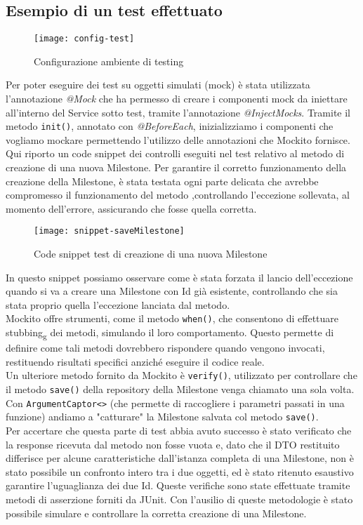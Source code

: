 \subsection{Esempio di un test effettuato}
\begin{figure}[H] 
    \centering 
    \texttt{[image: config-test]} 
    \caption{Configurazione ambiente di testing}
\end{figure}
Per poter eseguire dei test su oggetti simulati (mock) è stata utilizzata l'annotazione \textit{@Mock} che ha permesso di creare i componenti mock da iniettare all’interno del Service sotto test, tramite l’annotazione \textit{@InjectMocks}. Tramite il metodo \texttt{init()}, annotato con \textit{@BeforeEach}, inizializziamo i componenti che vogliamo mockare permettendo l’utilizzo delle annotazioni che Mockito fornisce.\\
Qui riporto un code snippet dei controlli eseguiti nel test relativo al metodo di creazione di una nuova Milestone. Per garantire il corretto funzionamento della creazione della Milestone, è stata testata ogni parte delicata che avrebbe compromesso il funzionamento del metodo ,controllando l’eccezione sollevata, al momento dell’errore, assicurando che fosse quella corretta.\\

\begin{figure}[H] 
    \centering 
    \texttt{[image: snippet-saveMilestone]} 
    \caption{Code snippet test di creazione di una nuova Milestone}
\end{figure}

\noindent In questo snippet possiamo osservare come è stata forzata il lancio dell’eccezione quando si va a creare una Milestone con Id già esistente, controllando che sia stata proprio quella l’eccezione lanciata dal metodo.\\
Mockito offre strumenti, come il metodo \texttt{when()}, che consentono di effettuare stubbing\textsubscript{g} dei metodi, simulando il loro comportamento. Questo permette di definire come tali metodi dovrebbero rispondere quando vengono invocati, restituendo risultati specifici anziché eseguire il codice reale.\\ 
Un ulteriore metodo fornito da Mockito è \texttt{verify()}, utilizzato per controllare che il metodo \texttt{save()} della repository della Milestone venga chiamato una sola volta. Con \texttt{ArgumentCaptor<>} (che permette di raccogliere i parametri passati in una funzione) andiamo a "catturare" la Milestone salvata col metodo \texttt{save()}.\\
Per accertare che questa parte di test abbia avuto successo è stato verificato che la response ricevuta dal metodo non fosse vuota e, dato che il DTO restituito differisce per alcune caratteristiche dall’istanza completa di una Milestone, non è stato possibile un confronto intero tra i due oggetti, ed è stato ritenuto esaustivo garantire l’uguaglianza dei due Id. Queste verifiche sono state effettuate tramite metodi di asserzione forniti da JUnit.
Con l’ausilio di queste metodologie è stato possibile simulare e controllare la corretta creazione di una Milestone.\\


